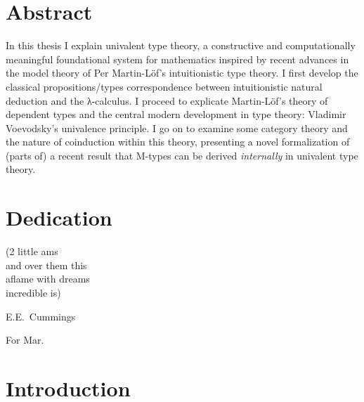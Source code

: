 \documentclass[12pt,twoside]{reedthesis}
\begin{document}
\tableofcontents

\chapter*{Abstract}

In this thesis I explain univalent type theory, a constructive and
computationally meaningful foundational system for mathematics inspired by
recent advances in the model theory of Per Martin-L\"of's intuitionistic type
theory. I first develop the classical propositions/types correspondence between
intuitionistic natural deduction and the λ-calculus. I proceed to explicate
Martin-L\"of's theory of dependent types and the central modern development in
type theory: Vladimir Voevodsky's univalence principle. I go on to examine some
category theory and the nature of coinduction within this theory, presenting a
novel formalization of (parts of) a recent result that M-types can be derived
\textit{internally} in univalent type theory.

\chapter*{Dedication}

\setlength{\epigraphwidth}{0.25\textwidth}
\epigraph{

  (2 little ams \\
  and over them this \\
  aflame with dreams \\
  incredible is)
}{E.E.\ Cummings}

For Mar.

\mainmatter %
\pagestyle{fancyplain} %

\chapter*{Introduction}
\end{document}

